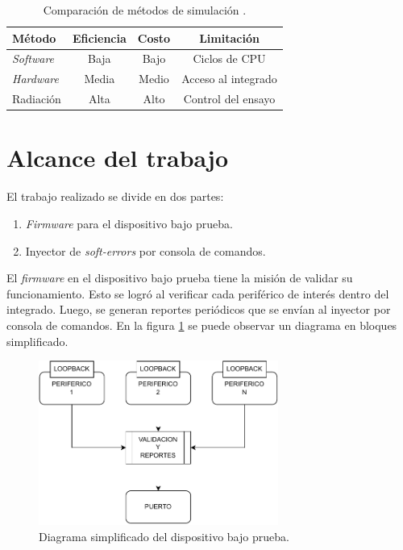 \begin{table}[h]
	\centering
	\caption[Comparación de métodos de simulación]{Comparación de métodos de simulación \citep{ARTICLE:velazco}.}
	\begin{tabular}{l c c c}    
		\toprule
        \textbf{Método}        & \textbf{Eficiencia} & \textbf{Costo} & \textbf{Limitación}\\
		\midrule
        \emph{Software}        & Baja                & Bajo           & Ciclos de CPU\\		
        \emph{Hardware}        & Media               & Medio          & Acceso al integrado\\
        Radiación              & Alta                & Alto           & Control del ensayo\\
		\bottomrule
		\hline
	\end{tabular}
	\label{tab:arte}
\end{table}

\newpage

\section{Alcance del trabajo}
\label{sec:alcance}

El trabajo realizado se divide en dos partes:
\begin{enumerate}
    \item \emph{Firmware} para el dispositivo bajo prueba.
    \item Inyector de \emph{soft-errors} por consola de comandos.
\end{enumerate}

El \emph{firmware} en el dispositivo bajo prueba tiene la misión de validar su funcionamiento.
Esto se logró al verificar cada periférico de interés dentro del integrado.
Luego, se generan reportes periódicos que se envían al inyector por consola de comandos.
En la figura \ref{fig:dutsimple} se puede observar un diagrama en bloques simplificado.

\begin{figure}[htbp]
	\centering
	\includegraphics[width=0.7\textwidth]{./Figures/dutsimple.pdf}
    \caption{Diagrama simplificado del dispositivo bajo prueba.}
	\label{fig:dutsimple}
\end{figure}

